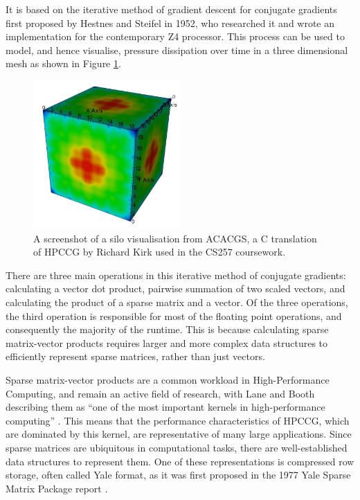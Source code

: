 It is based on the iterative method of gradient descent for conjugate gradients first proposed by Hestnes and Steifel in 1952\cite{hestenesMethodsConjugateGradients1952}, who researched it and wrote an implementation for the contemporary Z4 processor. This process can be used to model, and hence visualise, pressure dissipation over time in a three dimensional mesh as shown in Figure \ref{fig:acacgs_silo_output}.

\begin{figure}[H]
    \centering
    \includegraphics[width=0.5\textwidth]{images/2_background/acacgs_silo_output.png}
    \caption{A screenshot of a silo visualisation from ACACGS, a C translation of HPCCG by Richard Kirk used in the CS257 coursework.}
    \label{fig:acacgs_silo_output}
\end{figure}

There are three main operations in this iterative method of conjugate gradients: calculating a vector dot product, pairwise summation of two scaled vectors, and calculating the product of a sparse matrix and a vector. Of the three operations, the third operation is responsible for most of the floating point operations, and consequently the majority of the runtime. This is because calculating sparse matrix-vector products requires larger and more complex data structures to efficiently represent sparse matrices, rather than just vectors.

Sparse matrix-vector products are a common workload in High-Performance Computing, and remain an active field of research, with Lane and Booth describing them as ``one of the most important kernels in high-performance computing'' \cite{laneHeterogeneousSparseMatrixVector2023}. This means that the performance characteristics of HPCCG, which are dominated by this kernel, are representative of many large applications. Since sparse matrices are ubiquitous in computational tasks, there are well-established data structures to represent them. One of these representations is compressed row storage, often called Yale format, as it was first proposed in the 1977 Yale Sparse Matrix Package report \cite{eisenstat1977yale}.

